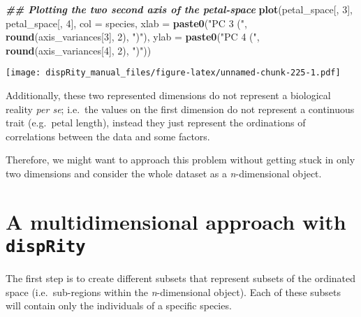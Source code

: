 \documentclass[
]{book}
\newenvironment{Shaded}{\begin{snugshade}}{\end{snugshade}}
\newcommand{\AttributeTok}[1]{\textcolor[rgb]{0.13,0.29,0.53}{#1}}
\newcommand{\DecValTok}[1]{\textcolor[rgb]{0.00,0.00,0.81}{#1}}
\newcommand{\DocumentationTok}[1]{\textcolor[rgb]{0.56,0.35,0.01}{\textbf{\textit{#1}}}}
\newcommand{\FunctionTok}[1]{\textcolor[rgb]{0.13,0.29,0.53}{\textbf{#1}}}
\newcommand{\NormalTok}[1]{#1}
\newcommand{\StringTok}[1]{\textcolor[rgb]{0.31,0.60,0.02}{#1}}
\begin{document}
\begin{Shaded}
\begin{Highlighting}[]
\DocumentationTok{\#\# Plotting the two second axis of the petal{-}space}
\FunctionTok{plot}\NormalTok{(petal\_space[, }\DecValTok{3}\NormalTok{], petal\_space[, }\DecValTok{4}\NormalTok{], }\AttributeTok{col =}\NormalTok{ species,}
    \AttributeTok{xlab =} \FunctionTok{paste0}\NormalTok{(}\StringTok{"PC 3 ("}\NormalTok{, }\FunctionTok{round}\NormalTok{(axis\_variances[}\DecValTok{3}\NormalTok{], }\DecValTok{2}\NormalTok{), }\StringTok{")"}\NormalTok{),}
    \AttributeTok{ylab =} \FunctionTok{paste0}\NormalTok{(}\StringTok{"PC 4 ("}\NormalTok{, }\FunctionTok{round}\NormalTok{(axis\_variances[}\DecValTok{4}\NormalTok{], }\DecValTok{2}\NormalTok{), }\StringTok{")"}\NormalTok{))}
\end{Highlighting}
\end{Shaded}

\texttt{[image: dispRity\_manual\_files/figure-latex/unnamed-chunk-225-1.pdf]}

Additionally, these two represented dimensions do not represent a biological reality \emph{per se}; i.e.~the values on the first dimension do not represent a continuous trait (e.g.~petal length), instead they just represent the ordinations of correlations between the data and some factors.

Therefore, we might want to approach this problem without getting stuck in only two dimensions and consider the whole dataset as a \emph{n}-dimensional object.

\hypertarget{a-multidimensional-approach-with-disprity}{%
\section{\texorpdfstring{A multidimensional approach with \texttt{dispRity}}{A multidimensional approach with dispRity}}\label{a-multidimensional-approach-with-disprity}}

The first step is to create different subsets that represent subsets of the ordinated space (i.e.~sub-regions within the \emph{n}-dimensional object).
Each of these subsets will contain only the individuals of a specific species.
\end{document}
